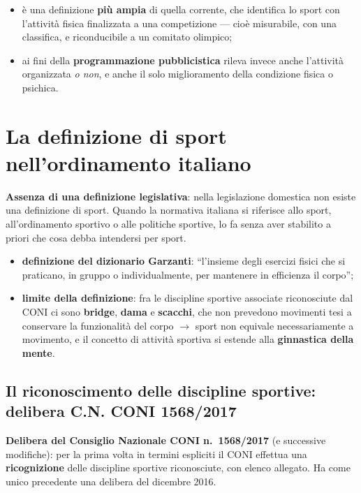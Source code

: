 \begin{itemize}
  \item è una definizione \textbf{più ampia} di quella corrente, che identifica lo sport con
    l'attività fisica finalizzata a una competizione --- cioè misurabile, con una classifica, e
    riconducibile a un comitato olimpico;
  \item ai fini della \textbf{programmazione pubblicistica} rileva invece anche l'attività
    organizzata \emph{o non}, e anche il solo miglioramento della condizione fisica o psichica.
\end{itemize}

\section{La definizione di sport nell'ordinamento italiano}

\textbf{Assenza di una definizione legislativa}: nella legislazione domestica non esiste una
definizione di sport. Quando la normativa italiana si riferisce allo sport, all'ordinamento
sportivo o alle politiche sportive, lo fa senza aver stabilito a priori che cosa debba
intendersi per sport.

\begin{itemize}
  \item \textbf{definizione del dizionario Garzanti}: ``l'insieme degli esercizi fisici che si
    praticano, in gruppo o individualmente, per mantenere in efficienza il corpo'';
  \item \textbf{limite della definizione}: fra le discipline sportive associate riconosciute dal
    CONI ci sono \textbf{bridge}, \textbf{dama} e \textbf{scacchi}, che non prevedono movimenti
    tesi a conservare la funzionalità del corpo $\rightarrow$ sport non equivale necessariamente a
    movimento, e il concetto di attività sportiva si estende alla \textbf{ginnastica della mente}.
\end{itemize}

\subsection{Il riconoscimento delle discipline sportive: delibera C.N. CONI 1568/2017}

\textbf{Delibera del Consiglio Nazionale CONI n.\ 1568/2017} (e successive modifiche): per la
prima volta in termini espliciti il CONI effettua una \textbf{ricognizione} delle discipline
sportive riconosciute, con elenco allegato. Ha come unico precedente una delibera del dicembre
2016.

